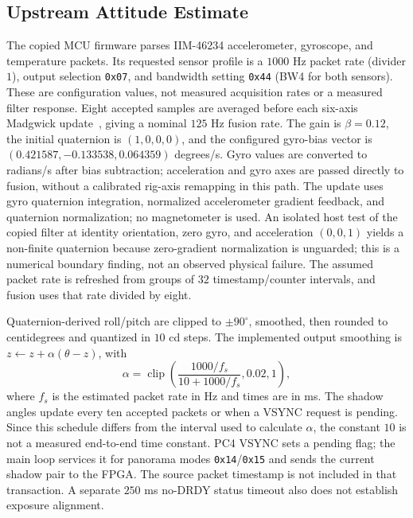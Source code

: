 \subsection{Upstream Attitude Estimate}
The copied MCU firmware parses IIM-46234 accelerometer, gyroscope, and
temperature packets. Its requested sensor profile is a $1000$ Hz packet
rate (divider $1$), output selection \texttt{0x07}, and bandwidth setting
\texttt{0x44} (BW4 for both sensors). These are configuration values, not
measured acquisition rates or a measured filter response. Eight accepted
samples are averaged before each six-axis Madgwick update~\cite{madgwick2011gradient}, giving a nominal
$125$ Hz fusion rate. The gain is $\beta=0.12$, the initial quaternion is
$(1,0,0,0)$, and the configured gyro-bias vector is
$(0.421587,-0.133538,0.064359)$ degrees/s. Gyro values are converted to
radians/s after bias subtraction; acceleration and gyro axes are passed
directly to fusion, without a calibrated rig-axis remapping in this path.
The update uses gyro quaternion integration, normalized accelerometer
gradient feedback, and quaternion normalization; no magnetometer is used.
An isolated host test of the copied filter at identity orientation, zero
gyro, and acceleration $(0,0,1)$ yields a non-finite quaternion because
zero-gradient normalization is unguarded; this is a numerical boundary
finding, not an observed physical failure.
The assumed packet rate is refreshed from groups of $32$ timestamp/counter
intervals, and fusion uses that rate divided by eight.

Quaternion-derived roll/pitch are clipped to $\pm90^\circ$, smoothed, then
rounded to centidegrees and quantized in $10$ cd steps. The implemented
output smoothing is $z\leftarrow z+\alpha(\theta-z)$, with
\begin{equation}
 \alpha=\operatorname{clip}\!\left(
 \frac{1000/f_s}{10+1000/f_s},0.02,1\right),
\end{equation}
where $f_s$ is the estimated packet rate in Hz and times are in ms.
The shadow angles update every ten accepted packets or when a VSYNC request
is pending. Since this schedule differs from the interval used to calculate
$\alpha$, the constant $10$ is not a measured end-to-end time constant.
PC4 VSYNC sets a pending flag; the main loop services it for panorama modes
\texttt{0x14}/\texttt{0x15} and sends the current shadow pair to the FPGA.
The source packet timestamp is not included in that transaction. A separate
$250$ ms no-DRDY status timeout also does not establish exposure alignment.

